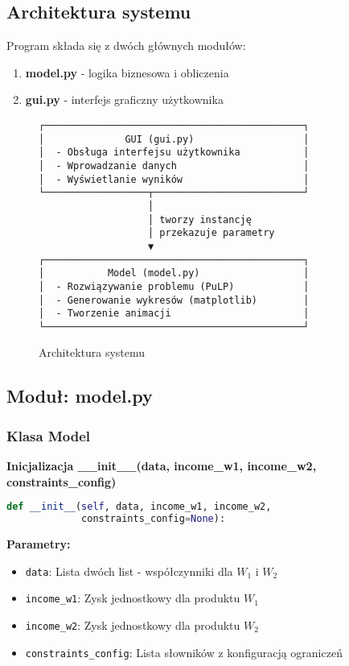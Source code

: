 \documentclass[12pt,a4paper]{article}
\begin{document}
\subsection{Architektura systemu}

Program składa się z dwóch głównych modułów:

\begin{enumerate}
    \item \textbf{model.py} - logika biznesowa i obliczenia
    \item \textbf{gui.py} - interfejs graficzny użytkownika
\end{enumerate}

\begin{figure}[H]
\centering
\begin{verbatim}
┌─────────────────────────────────────────────┐
│              GUI (gui.py)                   │
│  - Obsługa interfejsu użytkownika           │
│  - Wprowadzanie danych                      │
│  - Wyświetlanie wyników                     │
└──────────────────┬──────────────────────────┘
                   │
                   │ tworzy instancję
                   │ przekazuje parametry
                   ▼
┌─────────────────────────────────────────────┐
│           Model (model.py)                  │
│  - Rozwiązywanie problemu (PuLP)            │
│  - Generowanie wykresów (matplotlib)        │
│  - Tworzenie animacji                       │
└─────────────────────────────────────────────┘
\end{verbatim}
\caption{Architektura systemu}
\end{figure}

\subsection{Moduł: model.py}

\subsubsection{Klasa Model}

\textbf{Inicjalizacja \_\_init\_\_(data, income\_w1, income\_w2, constraints\_config)}

\begin{lstlisting}[language=Python]
def __init__(self, data, income_w1, income_w2, 
             constraints_config=None):
\end{lstlisting}

\textbf{Parametry:}
\begin{itemize}
    \item \texttt{data}: Lista dwóch list - współczynniki dla $W_1$ i $W_2$
    \item \texttt{income\_w1}: Zysk jednostkowy dla produktu $W_1$
    \item \texttt{income\_w2}: Zysk jednostkowy dla produktu $W_2$
    \item \texttt{constraints\_config}: Lista słowników z konfiguracją ograniczeń
\end{itemize}
\end{document}
